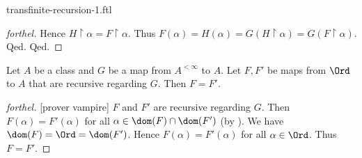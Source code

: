 \documentclass{naproche-library}
\begin{document}
\begin{smodule}[title=Transfinite Recursion I]{transfinite-recursion-1.ftl}
\begin{proof}[forthel]
      Hence $H \restriction \alpha = F \restriction \alpha$.
      Thus $F(\alpha)
        = H(\alpha)
        = G(H \restriction \alpha)
        = G(F \restriction \alpha)$.
    Qed.
  Qed.
\end{proof}

\begin{theorem*}[forthel,title=Transfinite Recursion Theorem: Uniqueness,id=transfinite-recursion_uniqueness]
  Let $A$ be a class and $G$ be a map from $A^{< \infty}$ to $A$.
  Let $F, F'$ be maps from $\Ord$ to $A$ that are recursive regarding $G$.
  Then $F = F'$.
\end{theorem*}
\begin{proof}[forthel]
  [prover vampire]
  $F$ and $F'$ are recursive regarding $G$.
  Then $F(\alpha) = F'(\alpha)$ for all $\alpha \in \dom(F) \cap \dom(F')$ (by ).
  We have $\dom(F) = \Ord = \dom(F')$.
  Hence $F(\alpha) = F'(\alpha)$ for all $\alpha \in \Ord$.
  Thus $F = F'$.
\end{proof}
\end{smodule}
\end{document}

